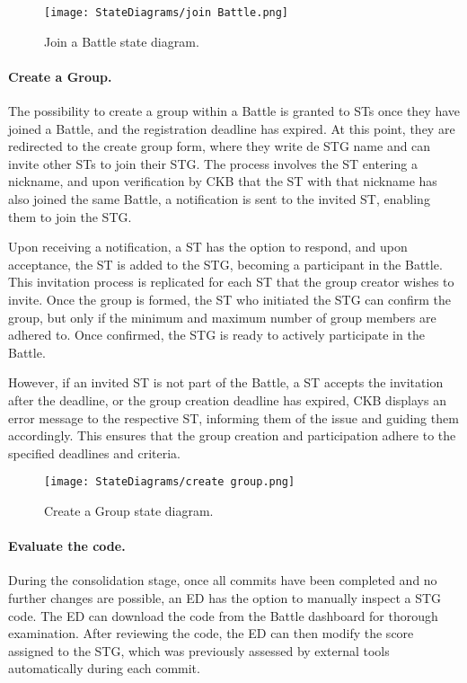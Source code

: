 \begin{figure}[H]
    \begin{center}
        \texttt{[image: StateDiagrams/join Battle.png]}
        \caption{Join a Battle state diagram.}
        \label{fig:join_Battle_sd}%
    \end{center}
\end{figure}

\paragraph{Create a Group.}
The possibility to create a group within a Battle is granted to STs once they have joined a Battle, and the registration deadline has expired. At this point, they are redirected to the create group form, where they write de STG name and can invite other STs to join their STG. The process involves the ST entering a nickname, and upon verification by CKB that the ST with that nickname has also joined the same Battle, a notification is sent to the invited ST, enabling them to join the STG.

Upon receiving a notification, a ST has the option to respond, and upon acceptance, the ST is added to the STG, becoming a participant in the Battle. This invitation process is replicated for each ST that the group creator wishes to invite. Once the group is formed, the ST who initiated the STG can confirm the group, but only if the minimum and maximum number of group members are adhered to. Once confirmed, the STG is ready to actively participate in the Battle.

However, if an invited ST is not part of the Battle, a ST accepts the invitation after the deadline, or the group creation deadline has expired, CKB displays an error message to the respective ST, informing them of the issue and guiding them accordingly. This ensures that the group creation and participation adhere to the specified deadlines and criteria.

\begin{figure}[H]
    \begin{center}
        \texttt{[image: StateDiagrams/create group.png]}
        \caption{Create a Group state diagram.}
        \label{fig:create_group_sd}%
    \end{center}
\end{figure}

\paragraph{Evaluate the code.}
During the consolidation stage, once all commits have been completed and no further changes are possible, an ED has the option to manually inspect a STG code. The ED can download the code from the Battle dashboard for thorough examination. After reviewing the code, the ED can then modify the score assigned to the STG, which was previously assessed by external tools automatically during each commit.

